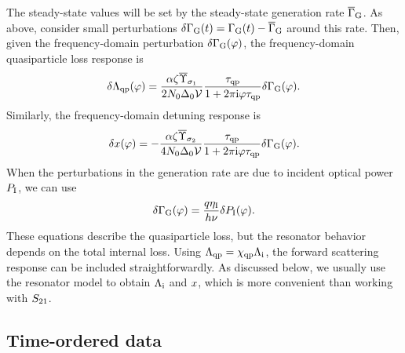 The steady-state values will be set by the steady-state generation rate $\overline{\Gamma}_{\mathrm{G}}$.
As above, consider small perturbations
$\delta\Gamma_{\mathrm{G}}(t)
  =
  \Gamma_{\mathrm{G}}(t) - \overline{\Gamma}_{\mathrm{G}}$ around this rate.
Then, given the frequency-domain perturbation $\delta\Gamma_{\mathrm{G}}(\varphi)$, the frequency-domain quasiparticle loss response is
\begin{equation}
\delta\Lambda_{\mathrm{qp}}(\varphi)
  =
  \frac{\alpha \zeta \overline{\Upsilon}_{\sigma_1}}{2 N_0 \Delta_0 \mathcal{V}}
  \frac{\tau_{\mathrm{qp}}}{1 + 2 \pi \mathrm{i} \varphi \tau_{\mathrm{qp}}}
  \delta\Gamma_{\mathrm{G}}(\varphi).
\end{equation}
Similarly, the frequency-domain detuning response is
\begin{equation}
\delta x(\varphi)
  =
  -\frac{\alpha \zeta \overline{\Upsilon}_{\sigma_2}}{4 N_0 \Delta_0 \mathcal{V}}
  \frac{\tau_{\mathrm{qp}}}{1 + 2 \pi \mathrm{i} \varphi \tau_{\mathrm{qp}}}
  \delta\Gamma_{\mathrm{G}}(\varphi).
\end{equation}
When the perturbations in the generation rate are due to incident optical power $P_{\mathrm{I}}$, we can use
\begin{equation}
\delta\Gamma_{\mathrm{G}}(\varphi)
  =
  \frac{q \eta_{\mathrm{I}}}{h \nu}
  \delta P_{\mathrm{I}}(\varphi).
\end{equation}
These equations describe the quasiparticle loss, but the resonator behavior depends on the total internal loss.
Using
$\Lambda_{\mathrm{qp}} = \chi_{\mathrm{qp}} \Lambda_{\mathrm{i}}$,
the forward scattering response can be included straightforwardly.
As discussed below, we usually use the resonator model to obtain $\Lambda_{\mathrm{i}}$ and $x$, which is more convenient than working with $S_{21}$.


\subsection{Time-ordered data}
\label{sec:theory.response.time-ordered_data}

